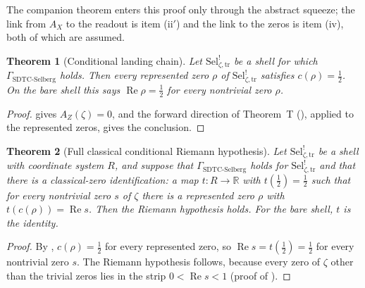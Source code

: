 \documentclass[11pt]{article}
\DeclareMathOperator{\Real}{Re}
\newcommand{\AZ}{A_{Z}(\zeta)}
\newcommand{\Sel}{\mathrm{Sel}^{!}_{\zeta,\mathrm{tr}}}
\newcommand{\GamSDTCSelberg}{\Gamma_{\mathrm{SDTC\text{-}Selberg}}}
\newcommand{\AX}{A_{X}}
\newtheorem{theorem}{Theorem}[section]
\theoremstyle{definition}
\begin{document}
The companion theorem enters this proof only through the abstract
squeeze; the link from \(\AX\) to the readout is item (ii\('\)) and the
link to the zeros is item (iv), both of which are assumed.

\begin{theorem}[Conditional landing chain]
\label{thm:rh:conditional}
Let \(\Sel\) be a shell for which \(\GamSDTCSelberg\) holds.  Then every represented zero \(\rho\) of \(\Sel\)
satisfies \(c(\rho)=\frac12\).  On the bare shell this says
\(\Real\rho=\frac12\) for every nontrivial zero \(\rho\).
\end{theorem}

\begin{proof}
 gives \(\AZ=0\), and the forward
direction of Theorem~T (), applied
to the represented zeros, gives the conclusion.
\end{proof}

\begin{theorem}[Full classical conditional Riemann hypothesis]
\label{thm:rh:full-classical}
Let \(\Sel\) be a shell with coordinate system \(R\), and suppose that
\(\GamSDTCSelberg\) holds for \(\Sel\) and that there is a
\emph{classical-zero identification}: a map \(t:R\to\mathbb R\) with \(t(\frac12)=\frac12\)
such that for every nontrivial zero \(s\) of \(\zeta\) there is a
represented zero \(\rho\) with \(t(c(\rho))=\Real s\).
Then the Riemann hypothesis holds.  For the bare shell, \(t\) is the
identity.
\end{theorem}

\begin{proof}
By , \(c(\rho)=\frac12\) for every
represented zero, so \(\Real s=t(\frac12)=\frac12\) for every nontrivial
zero \(s\).  The Riemann hypothesis follows, because every zero of \(\zeta\) other
than the trivial zeros lies in the strip \(0<\Real s<1\) (proof of
).
\end{proof}
\end{document}
